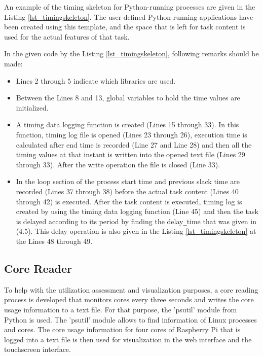 An example of the timing skeleton for Python-running processes are given in the Listing \ref{lst_timingskeleton}. The user-defined Python-running applications have been created using this template, and the space that is left for task content is used for the actual features of that task.



In the given code by the Listing \ref{lst_timingskeleton}, following remarks should be made:

\begin{itemize}
	\item Lines 2 through 5 indicate which libraries are used.
	\item Between the Lines 8 and 13, global variables to hold the time values are initialized.
	\item A timing data logging function is created (Lines 15 through 33). In this function, timing log file is opened (Lines 23 through 26), execution time is calculated after end time is recorded (Line 27 and Line 28) and then all the timing values at that instant is written into the opened text file (Lines 29 through 33). After the write operation the file is closed (Line 33).
	\item In the loop section of the process start time and previous slack time are recorded (Lines 37 through 38) before the actual task content (Lines 40 through 42) is executed. After the task content is executed, timing log is created by using the timing data logging function (Line 45) and then the task is delayed according to its period by finding the delay\texttt{\_}time that was given in (4.5). This delay operation is also given in the Listing \ref{lst_timingskeleton} at the Lines 48 through 49.  
\end{itemize}

\subsection{Core Reader}
To help with the utilization assessment and visualization purposes, a core reading process is developed that monitors cores every three seconds and writes the core usage information to a text file. For that purpose, the 'psutil' module \cite{psutil} from Python is used. The 'psutil' module allows to find information of Linux processes and cores. The core usage information for four cores of Raspberry Pi that is logged into a text file is then used for visualization in the web interface and the touchscreen interface. 

